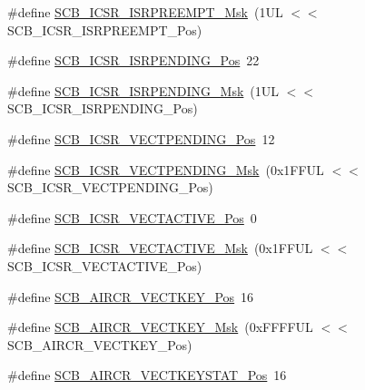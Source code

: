 \begin{DoxyCompactItemize}
\item 
\#define \mbox{\hyperlink{group___c_m_s_i_s___s_c_b_gaa966600396290808d596fe96e92ca2b5}{S\+C\+B\+\_\+\+I\+C\+S\+R\+\_\+\+I\+S\+R\+P\+R\+E\+E\+M\+P\+T\+\_\+\+Msk}}~(1\+U\+L $<$$<$ S\+C\+B\+\_\+\+I\+C\+S\+R\+\_\+\+I\+S\+R\+P\+R\+E\+E\+M\+P\+T\+\_\+\+Pos)
\item 
\#define \mbox{\hyperlink{group___c_m_s_i_s___s_c_b_ga10749d92b9b744094b845c2eb46d4319}{S\+C\+B\+\_\+\+I\+C\+S\+R\+\_\+\+I\+S\+R\+P\+E\+N\+D\+I\+N\+G\+\_\+\+Pos}}~22
\item 
\#define \mbox{\hyperlink{group___c_m_s_i_s___s_c_b_ga056d74fd538e5d36d3be1f28d399c877}{S\+C\+B\+\_\+\+I\+C\+S\+R\+\_\+\+I\+S\+R\+P\+E\+N\+D\+I\+N\+G\+\_\+\+Msk}}~(1\+U\+L $<$$<$ S\+C\+B\+\_\+\+I\+C\+S\+R\+\_\+\+I\+S\+R\+P\+E\+N\+D\+I\+N\+G\+\_\+\+Pos)
\item 
\#define \mbox{\hyperlink{group___c_m_s_i_s___s_c_b_gada60c92bf88d6fd21a8f49efa4a127b8}{S\+C\+B\+\_\+\+I\+C\+S\+R\+\_\+\+V\+E\+C\+T\+P\+E\+N\+D\+I\+N\+G\+\_\+\+Pos}}~12
\item 
\#define \mbox{\hyperlink{group___c_m_s_i_s___s_c_b_gacb6992e7c7ddc27a370f62878a21ef72}{S\+C\+B\+\_\+\+I\+C\+S\+R\+\_\+\+V\+E\+C\+T\+P\+E\+N\+D\+I\+N\+G\+\_\+\+Msk}}~(0x1\+F\+F\+U\+L $<$$<$ S\+C\+B\+\_\+\+I\+C\+S\+R\+\_\+\+V\+E\+C\+T\+P\+E\+N\+D\+I\+N\+G\+\_\+\+Pos)
\item 
\#define \mbox{\hyperlink{group___c_m_s_i_s___s_c_b_gae4f602c7c5c895d5fb687b71b0979fc3}{S\+C\+B\+\_\+\+I\+C\+S\+R\+\_\+\+V\+E\+C\+T\+A\+C\+T\+I\+V\+E\+\_\+\+Pos}}~0
\item 
\#define \mbox{\hyperlink{group___c_m_s_i_s___s_c_b_ga5533791a4ecf1b9301c883047b3e8396}{S\+C\+B\+\_\+\+I\+C\+S\+R\+\_\+\+V\+E\+C\+T\+A\+C\+T\+I\+V\+E\+\_\+\+Msk}}~(0x1\+F\+F\+U\+L $<$$<$ S\+C\+B\+\_\+\+I\+C\+S\+R\+\_\+\+V\+E\+C\+T\+A\+C\+T\+I\+V\+E\+\_\+\+Pos)
\item 
\#define \mbox{\hyperlink{group___c_m_s_i_s___s_c_b_gaaa27c0ba600bf82c3da08c748845b640}{S\+C\+B\+\_\+\+A\+I\+R\+C\+R\+\_\+\+V\+E\+C\+T\+K\+E\+Y\+\_\+\+Pos}}~16
\item 
\#define \mbox{\hyperlink{group___c_m_s_i_s___s_c_b_ga90c7cf0c490e7ae55f9503a7fda1dd22}{S\+C\+B\+\_\+\+A\+I\+R\+C\+R\+\_\+\+V\+E\+C\+T\+K\+E\+Y\+\_\+\+Msk}}~(0x\+F\+F\+F\+F\+U\+L $<$$<$ S\+C\+B\+\_\+\+A\+I\+R\+C\+R\+\_\+\+V\+E\+C\+T\+K\+E\+Y\+\_\+\+Pos)
\item 
\#define \mbox{\hyperlink{group___c_m_s_i_s___s_c_b_gaec404750ff5ca07f499a3c06b62051ef}{S\+C\+B\+\_\+\+A\+I\+R\+C\+R\+\_\+\+V\+E\+C\+T\+K\+E\+Y\+S\+T\+A\+T\+\_\+\+Pos}}~16
\item 
$$
\end{DoxyCompactItemize}
